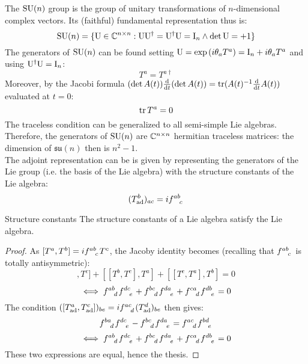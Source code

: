 The $ \mathrm{SU}(n) $ group is the group of unitary transformations of $ n $-dimensional complex vectors. Its (faithful) fundamental representation thus is:
\begin{equation*}
  \mathrm{SU}(n) = \{\mathrm{U} \in \mathbb{C}^{n \times n} : \mathrm{U}\mathrm{U}^\dagger = \mathrm{U}^\dagger\mathrm{U} = \mathrm{I}_n \land \det{\mathrm{U}} = +1 \}
\end{equation*}
The generators of $ \mathrm{SU}(n) $ can be found setting $ \mathrm{U} = \exp \left( i \theta_a T^a \right) = \mathrm{I}_n + i \theta_a T^a $ and using $ \mathrm{U}^\dagger\mathrm{U} = \mathrm{I}_n $:
\begin{equation}
  T^a = T^{a\dagger}
  \label{eq:sun-herm}
\end{equation}
Moreover, by the Jacobi formula $ (\det A(t)) \frac{\mathrm{d}}{\mathrm{d} t} (\det A(t)) = \operatorname{tr} (A(t)^{-1} \frac{\mathrm{d}}{\mathrm{d} t} A(t)) $ evaluated at $ t = 0 $:
\begin{equation}
  \operatorname{tr} T^a = 0
  \label{eq:sun-trace}
\end{equation}
The traceless condition can be generalized to all semi-simple Lie algebras.
Therefore, the generators of $ \mathrm{SU}(n) $ are $ \mathbb{C}^{n \times n} $ hermitian traceless matrices: the dimension of $ \mathfrak{su}(n) $ then is $ n^2 - 1 $.\\
The adjoint representation can be is given by representing the generators of the Lie group (i.e. the basis of the Lie algebra) with the structure constants of the Lie algebra:
\begin{equation}
  (T^b_\text{ad})_{ac} = i \tensor{f}{^a^b_c}
\end{equation}

\begin{proposition}{Structure constants}{}
  The structure constants of a Lie algebra satisfy the Lie algebra.

  \tcblower

  \begin{proof}
    As $ [T^a,T^b] = i \tensor{f}{^a^b_c} T^c $, the Jacoby identity becomes (recalling that $ \tensor{f}{^a^b_c} $ is totally antisymmetric):
    \begin{equation*}
      [[T^a,T^b],T^c] + [[T^b,T^c],T^a] + [[T^c,T^a],T^b] = 0
    \end{equation*}
    \begin{equation*}
      \iff \tensor{f}{^a^b_d} \tensor{f}{^d^c_e} + \tensor{f}{^b^c_d} \tensor{f}{^d^a_e} + \tensor{f}{^c^a_d} \tensor{f}{^d^b_e} = 0
    \end{equation*}
    The condition $ ([T^a_\text{ad},T^c_\text{ad}])_{be} = i \tensor{f}{^a^c_d} (T^d_\text{ad})_{be} $ then gives:
    \begin{equation*}
      \tensor{f}{^b^a_d} \tensor{f}{^d^c_e} - \tensor{f}{^b^c_d} \tensor{f}{^d^a_e} = \tensor{f}{^a^c_d} \tensor{f}{^b^d_e}
    \end{equation*}
    \begin{equation*}
      \iff \tensor{f}{^a^b_d} \tensor{f}{^d^c_e} + \tensor{f}{^b^c_d} \tensor{f}{^d^a_e} + \tensor{f}{^c^a_d} \tensor{f}{^d^b_e} = 0
    \end{equation*}
    These two expressions are equal, hence the thesis.
  \end{proof}
\end{proposition}

